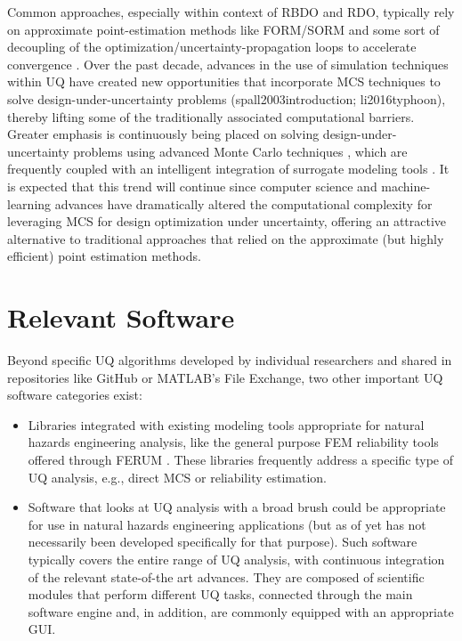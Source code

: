 Common approaches, especially within context of RBDO and RDO, typically rely on approximate point-estimation methods like FORM/SORM \citep{papadimitriou2018reliability} and some sort of decoupling of the optimization/uncertainty-propagation loops to accelerate convergence \citep{beyer2007robust}. Over the past decade, advances in the use of simulation techniques within UQ have created new opportunities that incorporate MCS techniques to solve design-under-uncertainty problems (spall2003introduction; li2016typhoon), thereby lifting some of the traditionally associated computational barriers. Greater emphasis is continuously being placed on solving design-under-uncertainty problems using advanced Monte Carlo techniques \citep{medina2014adaptive}, which are frequently coupled with an intelligent integration of surrogate modeling tools \citep{zhang2018adaptive}. It is expected that this trend will continue since computer science and machine-learning advances have dramatically altered the computational complexity for leveraging MCS for design optimization under uncertainty, offering an attractive alternative to traditional approaches that relied on the approximate (but highly efficient) point estimation methods. 

\section{Relevant Software}
\label{sec:uq_tools}

Beyond specific UQ algorithms developed by individual researchers and shared in repositories like GitHub or MATLAB’s File Exchange, two other important UQ software categories exist:

\begin{itemize}
    \item Libraries integrated with existing modeling tools appropriate for natural hazards engineering analysis, like the general purpose FEM reliability tools offered through FERUM \citep{bourinet2009review}. These libraries frequently address a specific type of UQ analysis, e.g., direct MCS or reliability estimation.
    \item Software that looks at UQ analysis with a broad brush could be appropriate for use in natural hazards engineering applications (but as of yet has not necessarily been developed specifically for that purpose). Such software typically covers the entire range of UQ analysis, with continuous integration of the relevant state-of-the art advances. They are composed of scientific modules that perform different UQ tasks, connected through the main software engine and, in addition, are commonly equipped with an appropriate GUI. 
\end{itemize}
	
